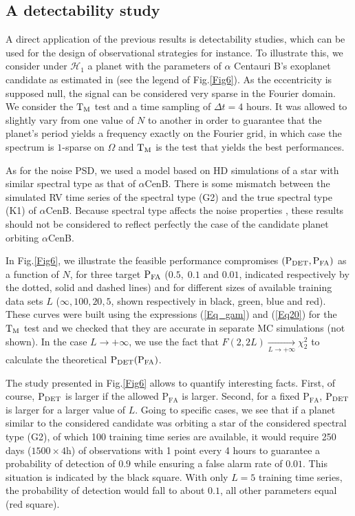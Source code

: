 \documentclass[journal]{IEEEtran}
\begin{document}
{ \subsection{A detectability study}
\label{SecG}

A direct application of the previous results is detectability studies, which can be used for the design of observational strategies for instance. 
To illustrate this{,} we consider under  $\mathcal{H}_1$  a planet with the  parameters of $\alpha$ Centauri B's exoplanet candidate as estimated in \cite{Dumusque_2012} (see the legend of Fig.\ref{Fig6}).  As the eccentricity is supposed null, the signal can be considered very sparse in the Fourier domain. We consider the $\rm T_M$ test and a time sampling of $\Delta t = 4$ hours. It was allowed to slightly vary from one value of $N$ to another in order to guarantee
that the planet's period yields a frequency exactly on the Fourier grid, in which case the spectrum is $1$-sparse on $\Omega$ and  $\rm T_M$ is  the test that  yields the best performances.

As for the noise PSD, we used a model based on HD simulations of a star with similar spectral type as that of $\alpha$CenB. 
{ There is some mismatch between the simulated RV time series of the spectral type} (G2) and { the} true spectral type (K1) of $\alpha$CenB. Because  spectral type affects the noise properties \cite{Meunier_2016},  these results should not be considered to reflect perfectly the case of the candidate planet orbiting $\alpha$CenB. 

In Fig.\ref{Fig6}, we illustrate the feasible performance compromises $(\rm P_{DET}, \rm P_{FA})$ as a function of $N$, for three target $\rm P_{FA}$ ($0.5,\; 0.1$ and $0.01$, indicated  respectively by the dotted, solid and dashed lines) and for different sizes of available training data sets  $L$ ($ \infty, 100, 20, 5$, shown respectively in black, green, blue and red). These curves were built using the expressions   (\ref{Eq_gam}) and  (\ref{Eq20}) for the ${\rm T_M}$ test and we checked that they are accurate in separate MC simulations (not shown). In the case $L \to+\infty$, we use the fact that $ F(2,2L)  \underset{L \to+\infty}{\longrightarrow} \chi_2^2$ to calculate the theoretical $\rm P_{DET}(P_{FA})$.

The study presented in Fig.\ref{Fig6}  allows to quantify interesting facts. 
First, of course,  $\rm P_{DET}$ is larger if the allowed $\textrm{P}_{\textrm{FA}}$ is larger. Second, for a fixed   $\textrm{P}_{\textrm{FA}}$,   $\rm P_{DET}$ is larger for a larger value of $L$. Going to specific cases, we see that if a planet similar to the considered candidate was orbiting a star of the considered spectral type (G2), of which 100 training time series are available, it would require  250 days ($1500\times 4$h) of observations   with 1 point every 4 hours to guarantee a probability of detection of $0.9$ while ensuring a false alarm rate of $0.01$. This situation is indicated by the black square. With only $L=5$ training time series, the probability of detection would fall to about $0.1$, all other parameters equal (red square).
}
\end{document}
